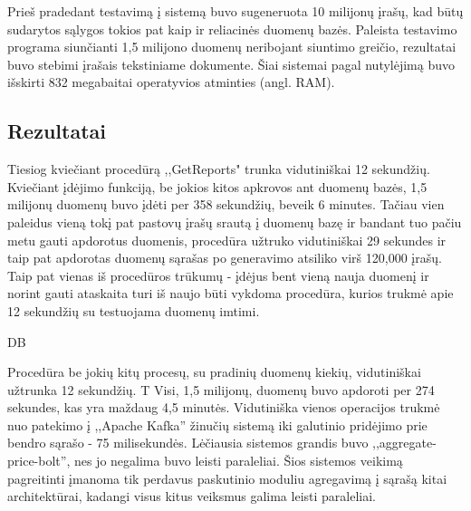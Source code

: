 \documentclass{VUMIFPSkursinis}
\begin{document}
Prieš pradedant testavimą į sistemą buvo sugeneruota 10 milijonų įrašų, kad būtų sudarytos sąlygos tokios pat kaip ir reliacinės duomenų bazės.
Paleista testavimo programa siunčianti 1,5 milijono duomenų neribojant siuntimo greičio, rezultatai buvo stebimi įrašais tekstiniame dokumente.
Šiai sistemai pagal nutylėjimą buvo išskirti 832 megabaitai operatyvios atminties (angl. RAM). 

\subsection{Rezultatai}
Tiesiog kviečiant procedūrą ,,GetReports" trunka vidutiniškai 12 sekundžių. Kviečiant įdėjimo funkciją, be jokios kitos apkrovos ant duomenų bazės, 1,5 milijonų duomenų
buvo įdėti per 358 sekundžių, beveik 6 minutes. Tačiau vien paleidus vieną tokį pat pastovų įrašų srautą į duomenų bazę ir bandant tuo pačiu metu gauti apdorotus duomenis,
procedūra užtruko vidutiniškai 29 sekundes ir taip pat apdorotas duomenų sąrašas po generavimo atsiliko virš 120,000 įrašų. Taip pat vienas iš 
procedūros trūkumų - įdėjus bent vieną nauja duomenį ir norint gauti ataskaita turi iš naujo būti vykdoma procedūra, kurios trukmė apie 12 sekundžių
su testuojama duomenų imtimi. \par

DB\par

Procedūra be jokių kitų procesų, su pradinių duomenų kiekių, vidutiniškai užtrunka 12 sekundžių. T
Visi, 1,5 milijonų, duomenų buvo apdoroti per 274 sekundes, kas yra maždaug 4,5 minutės. Vidutiniška vienos operacijos trukmė nuo 
patekimo į ,,Apache Kafka'' žinučių sistemą iki galutinio pridėjimo prie bendro sąrašo - 75 milisekundės.
Lėčiausia sistemos grandis buvo ,,aggregate-price-bolt'', nes jo negalima buvo leisti paraleliai. Šios sistemos veikimą pagreitinti 
įmanoma tik perdavus paskutinio moduliu agregavimą į sąrašą kitai architektūrai, kadangi visus kitus veiksmus galima leisti paraleliai.


\end{document}
